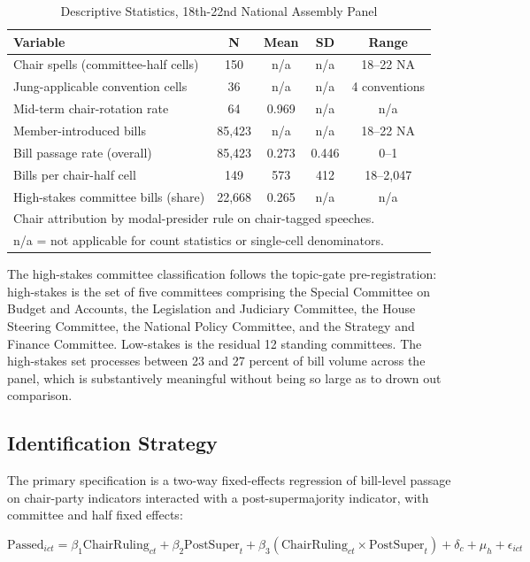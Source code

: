 \documentclass[11pt]{article}
\begin{document}
\begin{table}[ht]
\centering
\caption{Descriptive Statistics, 18th-22nd National Assembly Panel}
\label{tab:desc}
\begin{tabular}{lcccc}
\toprule
Variable & N & Mean & SD & Range \\
\midrule
Chair spells (committee-half cells) & 150 & n/a & n/a & 18--22 NA \\
Jung-applicable convention cells & 36 & n/a & n/a & 4 conventions \\
Mid-term chair-rotation rate & 64 & 0.969 & n/a & n/a \\
Member-introduced bills & 85,423 & n/a & n/a & 18--22 NA \\
Bill passage rate (overall) & 85,423 & 0.273 & 0.446 & 0--1 \\
Bills per chair-half cell & 149 & 573 & 412 & 18--2,047 \\
High-stakes committee bills (share) & 22,668 & 0.265 & n/a & n/a \\
\bottomrule
\multicolumn{5}{l}{\footnotesize Chair attribution by modal-presider rule on chair-tagged speeches.} \\
\multicolumn{5}{l}{\footnotesize n/a = not applicable for count statistics or single-cell denominators.} \\
\end{tabular}
\end{table}

The high-stakes committee classification follows the topic-gate pre-registration: high-stakes is the set of five committees comprising the Special Committee on Budget and Accounts, the Legislation and Judiciary Committee, the House Steering Committee, the National Policy Committee, and the Strategy and Finance Committee. Low-stakes is the residual 12 standing committees. The high-stakes set processes between 23 and 27 percent of bill volume across the panel, which is substantively meaningful without being so large as to drown out comparison.

\subsection{Identification Strategy}

The primary specification is a two-way fixed-effects regression of bill-level passage on chair-party indicators interacted with a post-supermajority indicator, with committee and half fixed effects:

\begin{equation}
\text{Passed}_{ict} = \beta_1 \text{ChairRuling}_{ct} + \beta_2 \text{PostSuper}_t + \beta_3 (\text{ChairRuling}_{ct} \times \text{PostSuper}_t) + \delta_c + \mu_h + \epsilon_{ict}
\label{eq:main}
\end{equation}
\end{document}
